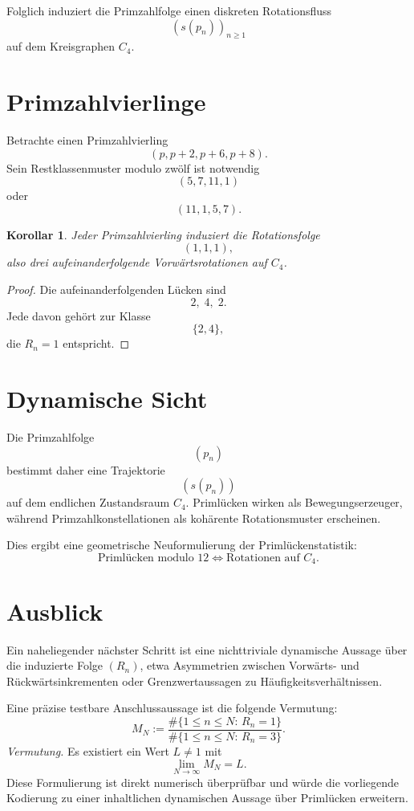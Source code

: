 \documentclass[11pt]{article}
\newtheorem{corollary}{Korollar}
\theoremstyle{definition}
\begin{document}
Folglich induziert die Primzahlfolge einen diskreten Rotationsfluss
\[
(s(p_n))_{n\ge 1}
\]
auf dem Kreisgraphen $C_4$.

\section{Primzahlvierlinge}

Betrachte einen Primzahlvierling
\[
(p,p+2,p+6,p+8).
\]
Sein Restklassenmuster modulo zw\"olf ist notwendig
\[
(5,7,11,1)
\]
oder
\[
(11,1,5,7).
\]

\begin{corollary}
Jeder Primzahlvierling induziert die Rotationsfolge
\[
(1,1,1),
\]
also drei aufeinanderfolgende Vorw\"artsrotationen auf $C_4$.
\end{corollary}

\begin{proof}
Die aufeinanderfolgenden L\"ucken sind
\[
2,\;4,\;2.
\]
Jede davon geh\"ort zur Klasse
\[
\{2,4\},
\]
die $R_n=1$ entspricht.
\end{proof}

\section{Dynamische Sicht}

Die Primzahlfolge
\[
(p_n)
\]
bestimmt daher eine Trajektorie
\[
(s(p_n))
\]
auf dem endlichen Zustandsraum $C_4$.
Priml\"ucken wirken als Bewegungserzeuger, w\"ahrend Primzahlkonstellationen als koh\"arente Rotationsmuster erscheinen.

Dies ergibt eine geometrische Neuformulierung der Priml\"uckenstatistik:
\[
\boxed{
\text{Priml\"ucken modulo }12
\Longleftrightarrow
\text{Rotationen auf }C_4.
}
\]

\section{Ausblick}

Ein naheliegender n\"achster Schritt ist eine nichttriviale dynamische Aussage \"uber die induzierte Folge $(R_n)$, etwa Asymmetrien zwischen Vorw\"arts- und R\"uckw\"artsinkrementen oder Grenzwertaussagen zu H\"aufigkeitsverh\"altnissen.

Eine pr\"azise testbare Anschlussaussage ist die folgende Vermutung:
\[
M_N
:=
\frac{\#\{1\le n\le N:\,R_n=1\}}
{\#\{1\le n\le N:\,R_n=3\}}.
\]
\emph{Vermutung.} Es existiert ein Wert $L\neq 1$ mit
\[
\lim_{N\to\infty} M_N = L.
\]
Diese Formulierung ist direkt numerisch \"uberpr\"ufbar und w\"urde die vorliegende Kodierung zu einer inhaltlichen dynamischen Aussage \"uber Priml\"ucken erweitern.
\end{document}
